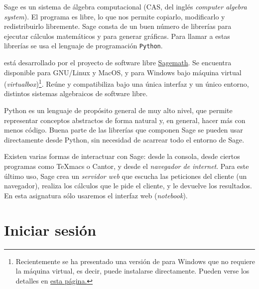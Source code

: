 Sage es un sistema de álgebra computacional (CAS, del inglés \emph{computer
algebra system}).
El programa es libre, lo que nos permite copiarlo, modificarlo y redistribuirlo
libremente. Sage consta de un buen número de librerías para ejecutar cálculos
matemáticos y para generar gráficas. Para llamar a estas libre\-rías se usa el
lenguaje de programación \texttt{Python}.

{\sage} está desarrollado por el proyecto de software libre
\href{http://www.sagemath.org/}{Sagemath}. Se encuentra disponible para
GNU/Linux y MacOS, y para Windows bajo máquina virtual ({\itshape virtualbox})\footnote{Recientemente se ha presentado una versi\'on de {\sage} para Windows que no requiere la m\'aquina virtual, es decir, puede instalarse directamente. Pueden verse los detalles en \href{https://github.com/sagemath/sage-windows} {esta p\'agina.}}. Reúne y compatibiliza
bajo una única interfaz y un único entorno, distintos sistemas algebraicos de
software libre. %

Python es un lenguaje de propósito general de muy alto nivel, que permite
representar conceptos abstractos de forma
natural y, en general, hacer más con menos código. Buena parte de las librerías
que componen Sage se pueden usar
directamente desde Python, sin necesidad de acarrear todo el entorno de Sage.


Existen varias formas de interactuar con Sage: desde la consola, desde ciertos
programas como TeXmacs o Cantor, y desde el \emph{navegador de internet}. Para
este último uso, Sage crea un \emph{servidor web} que escucha las peticiones del
cliente (un navegador), realiza los cálculos que le pide el cliente, y le
devuelve los resultados. En esta asignatura sólo usaremos el interfaz web (\emph{notebook}). 



\section{Iniciar sesión}\label{ini-ses}

